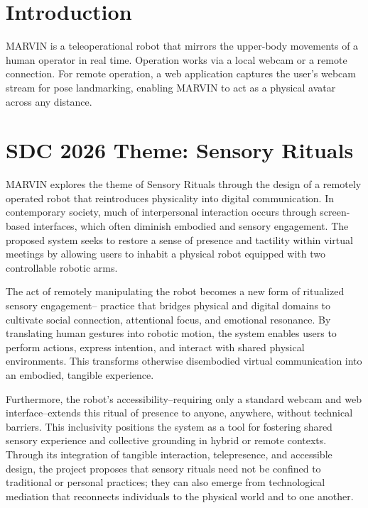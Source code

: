 \documentclass[sigconf]{acmart}
\begin{document}
\section{Introduction}
MARVIN is a teleoperational robot that mirrors the upper-body movements of a human operator in real time. Operation works via a local webcam or a remote connection. For remote operation, a web application captures the user's webcam stream for pose landmarking, enabling MARVIN to act as a physical avatar across any distance.

\section{SDC 2026 Theme: Sensory Rituals}
MARVIN explores the theme of Sensory Rituals through the design of a remotely operated robot that reintroduces physicality into digital communication. In contemporary society, much of interpersonal interaction occurs through screen-based interfaces, which often diminish embodied and sensory engagement. The proposed system seeks to restore a sense of presence and tactility within virtual meetings by allowing users to inhabit a physical robot equipped with two controllable robotic arms.

The act of remotely manipulating the robot becomes a new form of ritualized sensory engagement-- practice that bridges physical and digital domains to cultivate social connection, attentional focus, and emotional resonance. By translating human gestures into robotic motion, the system enables users to perform actions, express intention, and interact with shared physical environments. This transforms otherwise disembodied virtual communication into an embodied, tangible experience.

Furthermore, the robot’s accessibility--requiring only a standard webcam and web interface--extends this ritual of presence to anyone, anywhere, without technical barriers. This inclusivity positions the system as a tool for fostering shared sensory experience and collective grounding in hybrid or remote contexts. Through its integration of tangible interaction, telepresence, and accessible design, the project proposes that sensory rituals need not be confined to traditional or personal practices; they can also emerge from technological mediation that reconnects individuals to the physical world and to one another.

\end{document}
